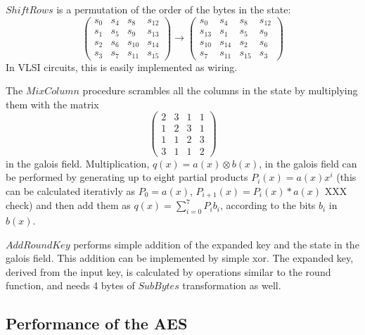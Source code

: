 $ShiftRows$ is a permutation of the order of the bytes in the state:
\begin{equation}
  \begin{pmatrix}
    s_0 & s_4 & s_8    & s_{12} \\
    s_1 & s_5 & s_9    & s_{13} \\
    s_2 & s_6 & s_{10} & s_{14} \\
    s_3 & s_7 & s_{11} & s_{15}
  \end{pmatrix} 
  \rightarrow
  \begin{pmatrix}
    s_0    & s_4    & s_8    & s_{12} \\
    s_{13} & s_1    & s_5    & s_9 \\
    s_{10} & s_{14} & s_2    & s_6 \\
    s_7    & s_{11} & s_{15} & s_3    
    \end{pmatrix}
\end{equation}
In VLSI circuits, this is easily implemented as wiring.

The $MixColumn$ procedure scrambles all the columns in the state
by multiplying them with the matrix
\begin{equation}
  \begin{pmatrix}
    2 & 3 & 1 & 1 \\
    1 & 2 & 3 & 1 \\
    1 & 1 & 2 & 3 \\
    3 & 1 & 1 & 2
  \end{pmatrix}
\end{equation}
in the galois field. Multiplication, $q(x)=a(x) \otimes b(x)$, in the
galois field can be performed by generating up to eight partial
products $P_i(x) = a(x) x^i$ (this can be calculated iterativly as
$P_0 = a(x)$, $P_{i+1}(x) = P_i(x)*a(x)$ XXX check) and then add them as $q(x) =
\sum_{i=0}^{7} P_i b_i$, according to the bits $b_i$ in $b(x)$.

$AddRoundKey$ performs simple addition of the expanded key and the
state in the galois field. This addition can be implemented by simple
xor. The expanded key, derived from the input key, is calculated by
operations similar to the round function, and needs 4 bytes of
$SubBytes$ transformation as well.

\subsection{Performance of the AES}

